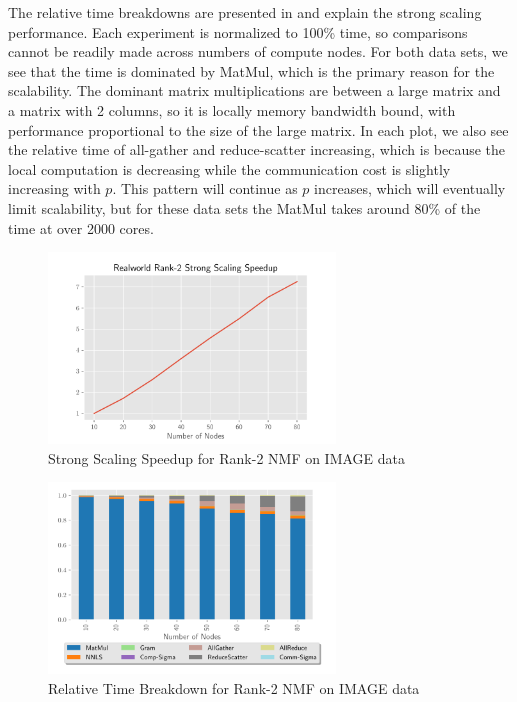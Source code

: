 \documentclass[conference,compsoc]{IEEEtran}
\begin{document}
The relative time breakdowns are presented in  and explain the strong scaling performance.
Each experiment is normalized to 100\% time, so comparisons cannot be readily made across numbers of compute nodes. 
For both data sets, we see that the time is dominated by MatMul, which is the primary reason for the scalability.
The dominant matrix multiplications are between a large matrix and a matrix with 2 columns, so it is locally memory bandwidth bound, with performance proportional to the size of the large matrix.
In each plot, we also see the relative time of all-gather and reduce-scatter increasing, which is because the local computation is decreasing while the communication cost is slightly increasing with $p$.
This pattern will continue as $p$ increases, which will eventually limit scalability, but for these data sets the MatMul takes around 80\% of the time at over 2000 cores.

\begin{figure}
\begin{center}
\includegraphics[height=2in, width=\columnwidth]{plots/realworld_rank2_speedup.pdf}
\caption{Strong Scaling Speedup for Rank-2 NMF on IMAGE data}
\label{fig:rwrank2speedup}
\end{center}
\end{figure}

\begin{figure}
\begin{center}
\includegraphics[height=2in, width=\columnwidth]{plots/realworld_rank2_strongscaling.pdf}
\caption{Relative Time Breakdown for Rank-2 NMF on IMAGE data}
\label{fig:rwrank2strongscaling}
\end{center}
\end{figure}
\end{document}
